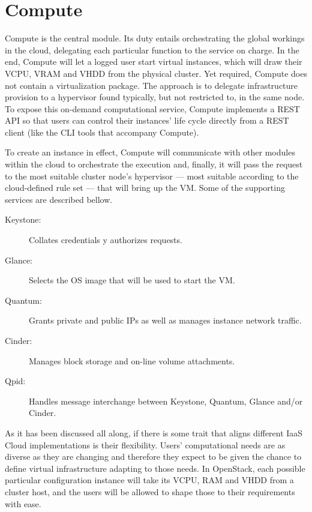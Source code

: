 \section{Compute}\label{sec:compute}

\noindent Compute is the central module. Its duty entails orchestrating the global workings in the cloud, delegating each particular function to the service on charge. In the end, Compute will let a logged user start virtual instances, which will draw their VCPU, VRAM and VHDD from the physical cluster. Yet required, Compute does not contain a virtualization package. The approach is to delegate infrastructure provision to a hypervisor found typically, but not restricted to, in the same node. To expose this on-demand computational service, Compute implements a REST API so that users can control their instances' life cycle directly from a REST client (like the CLI tools that accompany Compute).

To create an instance in effect, Compute will communicate with other modules within the cloud to orchestrate the execution and, finally, it will pass the request to the most suitable cluster node's hypervisor --- most suitable according to the cloud-defined rule set --- that will bring up the VM. Some of the supporting services are described bellow.

\begin{description}
 \item[Keystone:] Collates credentials y authorizes requests.
 \item[Glance:] Selects the OS image that will be used to start the VM.
 \item[Quantum:] Grants private and public IPs as well as manages instance network traffic.
 \item[Cinder:] Manages block storage and on-line volume attachments.
 \item[Qpid:] Handles message interchange between Keystone, Quantum, Glance and/or Cinder.
\end{description}

As it has been discussed all along, if there is some trait that aligns different IaaS Cloud implementations is their flexibility. Users' computational needs are as diverse as they are changing and therefore they expect to be given the chance to define virtual infrastructure adapting to those needs. In OpenStack, each possible particular configuration instance will take its VCPU, RAM and VHDD from a cluster host, and the users will be allowed to shape those to their requirements with ease.

